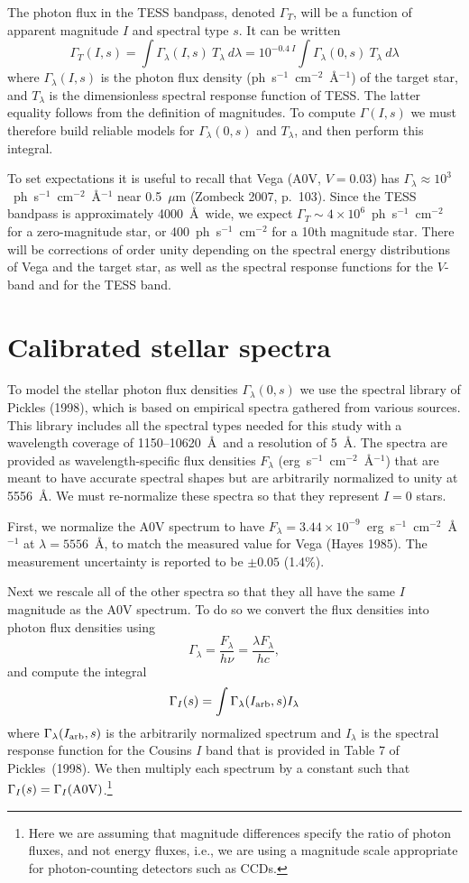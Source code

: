 \documentclass[preprint,10pt]{aastex}
\newcommand{\be}{\begin{displaymath}}
\newcommand{\ee}{\end{displaymath}}
\begin{document}
The photon flux in the TESS bandpass, denoted $\Gamma_T$, will be a function of apparent magnitude $I$ and spectral type $s$.  It can be written
\be
\Gamma_T(I,s) = \int \Gamma_\lambda(I,s)~T_\lambda~d\lambda 
= 10^{-0.4~I} \int \Gamma_\lambda(0,s)~T_\lambda~d\lambda
\ee
where $\Gamma_\lambda(I,s)$ is the photon flux density
(ph~s$^{-1}$~cm$^{-2}$~\AA$^{-1}$) of the target star, and $T_\lambda$
is
the dimensionless spectral response function of TESS. The latter equality follows
from the definition of magnitudes. To compute $\Gamma(I,s)$ we
must therefore
build reliable models for $\Gamma_\lambda(0,s)$ and $T_\lambda$,
and then perform this integral.

To set expectations it is useful to recall that Vega (A0V, $V=0.03$) has
$\Gamma_\lambda \approx 10^3$~ph~s$^{-1}$~cm$^{-2}$~\AA$^{-1}$ near
0.5~$\mu$m (Zombeck 2007, p.\ 103).  Since the TESS bandpass is
approximately 4000~\AA~wide, we expect $\Gamma_T \sim 4\times
10^6$~ph~s$^{-1}$~cm$^{-2}$ for a zero-magnitude star, or
400~ph~s$^{-1}$~cm$^{-2}$ for a 10th magnitude star.  There will be
corrections of order unity depending on the spectral energy
distributions of Vega and the target star, as well as the spectral
response functions for the $V$-band and for the TESS band.

\section{Calibrated stellar spectra}

To model the stellar photon flux densities $\Gamma_\lambda(0,s)$ we
use the spectral library of Pickles (1998), which is based on
empirical spectra gathered from various sources.  This library
includes all the spectral types needed for this study with a
wavelength coverage of 1150--10620~\AA~and a resolution of 5~\AA. The
spectra are provided as wavelength-specific flux densities $F_\lambda$
(erg~s$^{-1}$~cm$^{-2}$~\AA$^{-1}$) that are meant to have accurate spectral
shapes but are arbitrarily normalized to unity at 5556~\AA.
We must re-normalize these spectra so that they represent $I=0$ stars.

First, we normalize the A0V spectrum to have $F_\lambda = 3.44\times
10^{-9}$~erg~s$^{-1}$~cm$^{-2}$~\AA$^{-1}$ at $\lambda = 5556$~\AA, to match
the measured value for Vega (Hayes 1985).  The measurement uncertainty
is reported to be $\pm 0.05$ (1.4\%).

Next we rescale all of the other spectra so that they all have the
same $I$ magnitude as the A0V spectrum. To do so we convert
the flux densities into
photon flux densities using
\be
\Gamma_\lambda = \frac{F_\lambda}{h \nu} = \frac{\lambda F_\lambda}{hc},
\ee
and compute the integral
\be
\Gamma_I(s) = \int \Gamma_\lambda(I_{\rm arb},s) I_\lambda
\ee
where $\Gamma_\lambda(I_{\rm arb},s)$ is the arbitrarily normalized
spectrum and $I_\lambda$ is the spectral response function for the Cousins
$I$ band that is provided in Table 7 of Pickles~(1998).  We then
multiply each spectrum by a constant such that $\Gamma_I(s) =
\Gamma_I({\rm A0V})$.\footnote{Here we are assuming that magnitude
  differences specify the ratio of photon fluxes, and not energy
  fluxes, i.e., we are using a magnitude scale appropriate for
  photon-counting detectors such as CCDs.}
\end{document}
